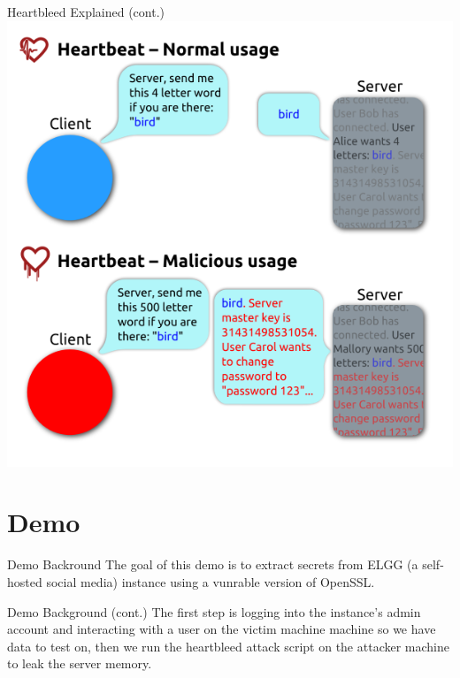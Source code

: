 \documentclass{beamer}
\begin{document}
\begin{frame}{Heartbleed Explained (cont.)}
    \includegraphics[width=\textheight]{heartbleed_visualization.png}
\end{frame}

\section{Demo}
\begin{frame}{Demo Backround}
    The goal of this demo is to extract secrets from ELGG (a self-hosted social media)
    instance using a vunrable version of OpenSSL.

\end{frame}

\begin{frame}{Demo Background (cont.)}
    The first step is logging into the instance's admin account and interacting with a user
    on the victim machine machine so we have data to test on, then we run the heartbleed
    attack script on the attacker machine to leak the server memory.
\end{frame}
\end{document}
